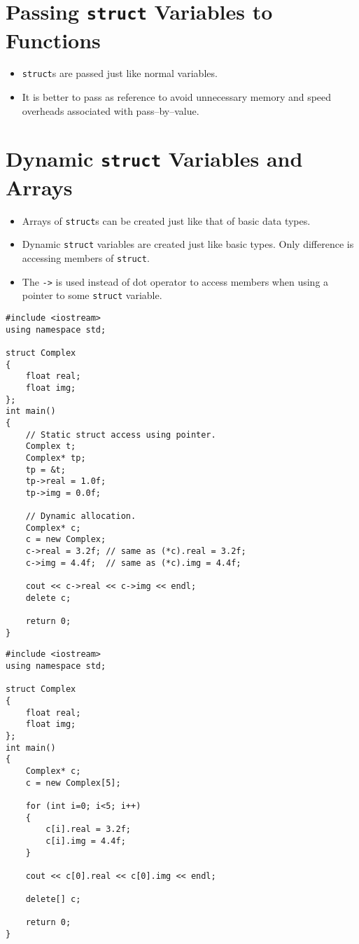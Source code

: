 \documentclass[12pt,a4paper]{article}
\begin{document}
\section{Passing \texttt{struct} Variables to Functions}
\begin{itemize}
\item \texttt{struct}s are passed just like normal variables.
\item It is better to pass as reference to avoid unnecessary memory and speed overheads associated with pass--by--value.
\end{itemize}
\section{Dynamic \texttt{struct} Variables and Arrays}
\begin{itemize}
\item Arrays of \texttt{struct}s can be created just like that of basic data types.
\item Dynamic \texttt{struct} variables are created just like basic types. Only difference is accessing members of \texttt{struct}.
\item The \verb|->| is used instead of dot operator to access members when using a pointer to some \texttt{struct} variable.
\end{itemize}
\begin{lstlisting}[caption={Dynamic \texttt{struct}}]
#include <iostream>
using namespace std;

struct Complex
{
	float real;
	float img;
};
int main()
{
	// Static struct access using pointer.
	Complex t;
	Complex* tp;
	tp = &t;
	tp->real = 1.0f;
	tp->img = 0.0f;

	// Dynamic allocation.
	Complex* c;
	c = new Complex;
	c->real = 3.2f; // same as (*c).real = 3.2f;
	c->img = 4.4f;  // same as (*c).img = 4.4f;

	cout << c->real << c->img << endl;
	delete c;

	return 0;
}
\end{lstlisting}
\begin{lstlisting}[caption={Array of \texttt{struct}}]
#include <iostream>
using namespace std;

struct Complex
{
	float real;
	float img;
};
int main()
{
	Complex* c;
	c = new Complex[5];

	for (int i=0; i<5; i++)
	{
		c[i].real = 3.2f;
		c[i].img = 4.4f;
	}

	cout << c[0].real << c[0].img << endl;

	delete[] c;

	return 0;
}
\end{lstlisting}
\end{document}

